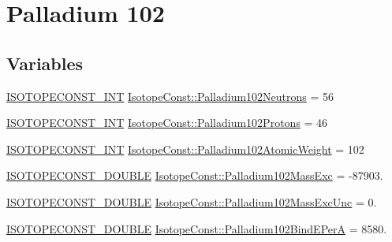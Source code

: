\hypertarget{group___isotope_const-_palladium-_pd102}{}\section{Palladium 102}
\label{group___isotope_const-_palladium-_pd102}
\subsection*{Variables}
\begin{DoxyCompactItemize}
\item 
\mbox{\hyperlink{group___isotope_const-_macros_ga5f18360b3e99483a35c32d789e62621c}{I\+S\+O\+T\+O\+P\+E\+C\+O\+N\+S\+T\+\_\+\+I\+NT}} \mbox{\hyperlink{group___isotope_const-_palladium-_pd102_gadf81a8bcf2ff440f6cb984a0db7c1244}{Isotope\+Const\+::\+Palladium102\+Neutrons}} = 56
\item 
\mbox{\hyperlink{group___isotope_const-_macros_ga5f18360b3e99483a35c32d789e62621c}{I\+S\+O\+T\+O\+P\+E\+C\+O\+N\+S\+T\+\_\+\+I\+NT}} \mbox{\hyperlink{group___isotope_const-_palladium-_pd102_ga6b74518f0da183b7e7fcd3acf6eb927e}{Isotope\+Const\+::\+Palladium102\+Protons}} = 46
\item 
\mbox{\hyperlink{group___isotope_const-_macros_ga5f18360b3e99483a35c32d789e62621c}{I\+S\+O\+T\+O\+P\+E\+C\+O\+N\+S\+T\+\_\+\+I\+NT}} \mbox{\hyperlink{group___isotope_const-_palladium-_pd102_ga078b33320abc20d88a0b8e2fb1833cb3}{Isotope\+Const\+::\+Palladium102\+Atomic\+Weight}} = 102
\item 
\mbox{\hyperlink{group___isotope_const-_macros_ga8f45a7272ce02c0b4c65c44636ed719a}{I\+S\+O\+T\+O\+P\+E\+C\+O\+N\+S\+T\+\_\+\+D\+O\+U\+B\+LE}} \mbox{\hyperlink{group___isotope_const-_palladium-_pd102_ga1be6c2c035105f7c0929f0774373e208}{Isotope\+Const\+::\+Palladium102\+Mass\+Exc}} = -\/87903.
\item 
\mbox{\hyperlink{group___isotope_const-_macros_ga8f45a7272ce02c0b4c65c44636ed719a}{I\+S\+O\+T\+O\+P\+E\+C\+O\+N\+S\+T\+\_\+\+D\+O\+U\+B\+LE}} \mbox{\hyperlink{group___isotope_const-_palladium-_pd102_ga5cab572732ba3c627190b026c1811eb7}{Isotope\+Const\+::\+Palladium102\+Mass\+Exc\+Unc}} = 0.
\item 
\mbox{\hyperlink{group___isotope_const-_macros_ga8f45a7272ce02c0b4c65c44636ed719a}{I\+S\+O\+T\+O\+P\+E\+C\+O\+N\+S\+T\+\_\+\+D\+O\+U\+B\+LE}} \mbox{\hyperlink{group___isotope_const-_palladium-_pd102_ga56cdd3722f1c4bd6292dcb701d898623}{Isotope\+Const\+::\+Palladium102\+Bind\+E\+PerA}} = 8580.
\item 

\end{DoxyCompactItemize}
